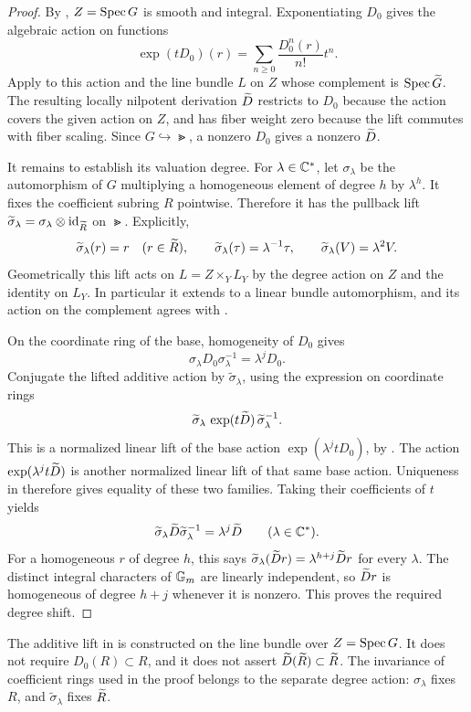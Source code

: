 \begin{proof}
By , $Z=\operatorname{Spec} G$ is smooth and integral.
Exponentiating $D_0$ gives the algebraic action on functions
\[
 \exp(tD_0)(r)=\sum_{n\ge0}\frac{D_0^n(r)}{n!}t^n.
\]
Apply  to this action and the line bundle
$L$ on $Z$ whose complement is $\operatorname{Spec}\widetilde G$.
The resulting locally nilpotent derivation $\widetilde D$ restricts to
$D_0$ because the action covers the given action on $Z$, and
has fiber weight zero because the lift commutes with fiber
scaling. Since $G\hookrightarrow\Gt$, a nonzero $D_0$ gives a
nonzero $\widetilde D$.

It remains to establish its valuation degree. For $\lambda\in\mathbb C^*$,
let $\sigma_\lambda$ be the automorphism of $G$ multiplying a
homogeneous element of degree $h$ by $\lambda^h$.
It fixes the coefficient subring $R$ pointwise. Therefore it has
the pullback lift
$\widetilde\sigma_\lambda=\sigma_\lambda\otimes\mathrm{id}_{\widetilde R}$
on $\Gt$. Explicitly,
\begin{equation}
\label{bun:degree-scaling}
 \widetilde\sigma_\lambda(r)=r\quad(r\in\widetilde R),\qquad
 \widetilde\sigma_\lambda(\tau)=\lambda^{-1}\tau,\qquad
 \widetilde\sigma_\lambda(V)=\lambda^2V.
\end{equation}
Geometrically this lift acts on $L=Z\times_Y L_Y$ by the degree
action on $Z$ and the identity on $L_Y$. In particular it extends
to a linear bundle automorphism, and its action on the complement
agrees with .

On the coordinate ring of the base, homogeneity of $D_0$ gives
\begin{equation}
\label{bun:base-conjugacy}
 \sigma_\lambda D_0\sigma_\lambda^{-1}=\lambda^jD_0.
\end{equation}
Conjugate the lifted additive action by
$\widetilde\sigma_\lambda$, using the expression on coordinate rings
\[
 \widetilde\sigma_\lambda\,\exp(t\widetilde D)\,
 \widetilde\sigma_\lambda^{-1}.
\]
This is a normalized linear lift of the base action
$\exp(\lambda^jtD_0)$, by .
The action $\exp(\lambda^jt\widetilde D)$ is another normalized linear
lift of that same base action. Uniqueness in
 therefore gives equality of these
two families. Taking their coefficients of $t$ yields
\[
 \widetilde\sigma_\lambda\widetilde D
 \widetilde\sigma_\lambda^{-1}=\lambda^j\widetilde D
 \qquad(\lambda\in\mathbb C^*).
\]
For a homogeneous $r$ of degree $h$, this says
$\widetilde\sigma_\lambda(\widetilde D r)=\lambda^{h+j}\widetilde D r$
for every $\lambda$. The distinct integral characters of
$\mathbb G_m$ are linearly independent, so $\widetilde D r$ is homogeneous of
degree $h+j$ whenever it is nonzero. This proves the required
degree shift.
\end{proof}

The additive lift in  is constructed
on the line bundle over $Z=\operatorname{Spec} G$. It does not require
$D_0(R)\subset R$, and it does not assert $\widetilde D(\widetilde R)\subset\widetilde R$.
The invariance of coefficient rings used in the proof belongs to
the separate degree action: $\sigma_\lambda$ fixes $R$, and
$\widetilde\sigma_\lambda$ fixes $\widetilde R$.

